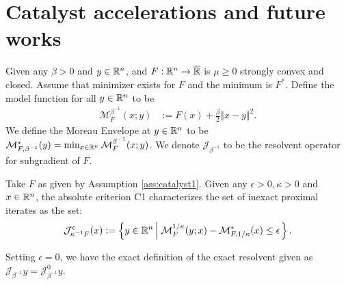 \documentclass[12pt]{article}
\begin{document}

\section{Catalyst accelerations and future works}\label{sec:catalyst}

    \begin{assumption}\label{ass:catalyst1}
        Given any $\beta > 0$ and $y \in \mathbb R^n$, and $F: \mathbb R^n\rightarrow \overline {\mathbb R}$ is $\mu \ge 0$ strongly convex and closed. 
        Assume that minimizer exists for $F$ and the minimum is $F^*$. 
        Define the model function for all $y\in \mathbb R^n$ to be 
        \begin{align*}
            \mathcal M^{\beta^{-1}}_F(x; y) &:= 
            F(x) + \frac{\beta}{2}\Vert x - y\Vert^2.
        \end{align*}
        We define the Moreau Envelope at $y \in \mathbb R^n$ to be $\mathcal M^*_{F,\beta^{-1}}(y) = \min_{x\in \mathbb R^n} \mathcal M_F^{\beta^{-1}}(x; y)$. 
        We denote $\mathcal J_{\beta^{-1}}$ to be the resolvent operator for subgradient of $F$. 
    \end{assumption}
    \begin{definition}\label{def:catalyst-termination-c1}
        Take $F$ as given by Assumption \ref{ass:catalyst1}.
        Given any $\epsilon > 0, \kappa > 0$ and $x \in \mathbb R^n$, the absolute criterion C1 characterizes the set of inexact proximal iterates as the set: 
        \begin{align*}
            \mathcal J_{\kappa^{-1} F}^\epsilon (x) := 
            \left\lbrace
                y \in \mathbb R^n \left | \; 
                        \mathcal M^{1/\kappa}_F (y; x) - 
                        \mathcal M^*_{F, 1/\kappa}(x) \le \epsilon
                \right.
            \right\rbrace. 
        \end{align*}
    \end{definition}
    \begin{remark}
        Setting $\epsilon = 0$, we have the exact definition of the exact resolvent given as $\mathcal J_{\beta^{-1}}y = \mathcal J^0_{\beta^{-1}}y$. 
    \end{remark}
\end{document}
